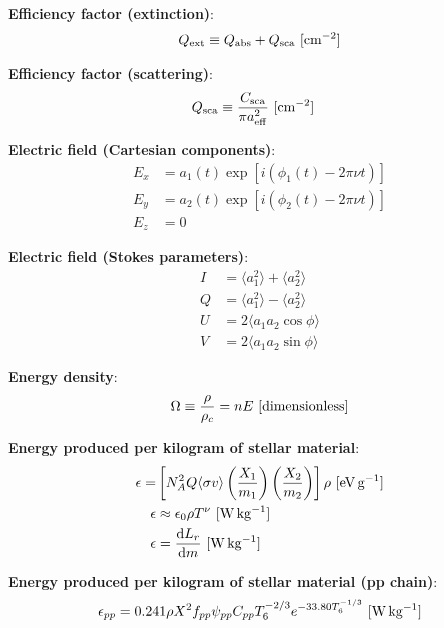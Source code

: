 \documentclass[a4paper,10pt]{article}
\begin{document}
{\noindent}\textbf{Efficiency factor (extinction)}:
\begin{align*}
    Q_{\rm ext} \equiv Q_{\rm abs} + Q_{\rm sca} ~ [{\rm cm^{-2}}]
\end{align*}

{\noindent}\textbf{Efficiency factor (scattering)}:
\begin{align*}
    Q_{\rm sca} &\equiv \frac{C_{\rm sca}}{\pi a_{\rm eff}^2} ~ [{\rm cm^{-2}}]
\end{align*}

{\noindent}\textbf{Electric field (Cartesian components)}:
\begin{align*}
    E_x &= a_1(t)\exp[i(\phi_1(t)-2\pi\nu t)] \\
    E_y &= a_2(t)\exp[i(\phi_2(t)-2\pi\nu t)] \\
    E_z &= 0
\end{align*}

{\noindent}\textbf{Electric field (Stokes parameters)}:
\begin{align*}
    I &= \langle{a_1^2}\rangle + \langle{a_2^2}\rangle \\
    Q &= \langle{a_1^2}\rangle - \langle{a_2^2}\rangle \\
    U &= 2\langle{a_1a_2\cos\phi}\rangle \\
    V &= 2\langle{a_1a_2\sin\phi}\rangle
\end{align*}

{\noindent}\textbf{Energy density}:
\begin{align*}
    \Omega \equiv \dfrac{\rho}{\rho_c} = nE ~ [{\rm dimensionless}]
\end{align*}

{\noindent}\textbf{Energy produced per kilogram of stellar material}:
\begin{align*}
    \epsilon = &\left[ N_A^2Q \langle\sigma v\rangle \left(\frac{X_1}{m_1}\right) \left(\frac{X_2}{m_2}\right) \right] \rho ~ [{\rm eV\,g^{-1}}] \\
    \epsilon &\approx \epsilon_0\rho T^\nu ~ [{\rm W\,kg^{-1}}] \\
    \epsilon &= \frac{{\rm d}L_r}{{\rm d}m} ~ [{\rm W\,kg^{-1}}]
\end{align*}

{\noindent}\textbf{Energy produced per kilogram of stellar material (pp chain)}:
\begin{align*}
    \epsilon_{pp} = 0.241\rho X^2 f_{pp}\psi_{pp}C_{pp}T_6^{-2/3}e^{-33.80T_6^{-1/3}} ~ [{\rm W\,kg^{-1}}]
\end{align*}
\end{document}
